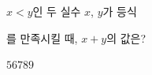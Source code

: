 $x<y$인 두 실수 $x$, $y$가 등식\par\smallskip{}\par\smallskip\noindent 를 만족시킬 때, $x+y$의 값은?
\begin{choices32}{$5$}{$6$}{$7$}{$8$}{$9$}\end{choices32}

